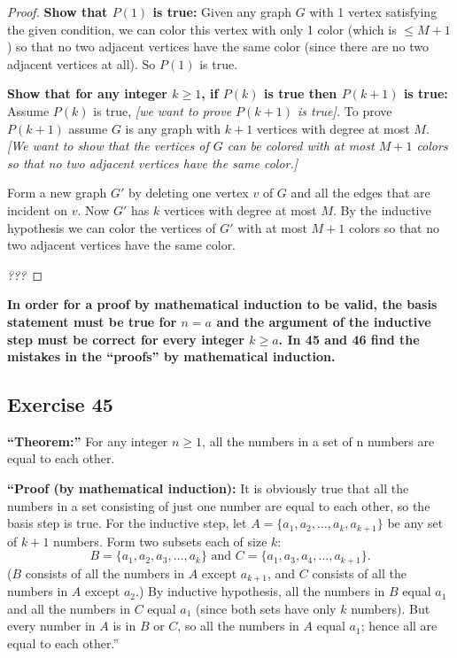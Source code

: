 \documentclass[14pt]{extarticle}
\newcommand{\cy}{\color{cyan}}
\begin{document}
\begin{proof}
    {\bf Show that $P(1)$ is true:} Given any graph $G$ with 1 vertex satisfying the given condition, we can color this vertex with only 1 color (which is $\leq M+1$) so that no two adjacent vertices have the same color (since there are no two adjacent vertices at all). So $P(1)$ is true.

        {\bf Show that for any integer $k \geq 1$, if $P(k)$ is true then $P(k+1)$ is true:} Assume $P(k)$ is true, {\it [we want to prove $P(k+1)$ is true].} To prove $P(k+1)$ assume $G$ is any graph with $k+1$ vertices with degree at most $M$. {\it [We want to show that the vertices of $G$ can be colored with at most $M+1$ colors so that no two adjacent vertices have the same color.]}


    Form a new graph $G'$ by deleting one vertex $v$ of $G$ and all the edges that are incident on $v$. Now $G'$ has $k$ vertices with degree at most $M$. By the inductive hypothesis we can color the vertices of $G'$ with at most $M+1$ colors so that no two adjacent vertices have the same color.

        {\it ???}
\end{proof}

{\bf \cy In order for a proof by mathematical induction to be valid, the basis statement must be true for $n = a$ and the argument of the inductive step must be correct for every integer $k \geq a$. In 45 and 46 find the mistakes in the “proofs” by mathematical induction.}

\subsection{Exercise 45}
{\bf “Theorem:”} For any integer $n \geq 1$, all the numbers in a set of n numbers are equal to each other.

    {\bf “Proof (by mathematical induction):} It is obviously true that all the numbers in a set consisting of just one number are equal to each other, so the basis step is true. For the inductive step, let $A = \{a_1, a_2, \ldots, a_k, a_{k+1}\}$ be any set of $k + 1$ numbers. Form two subsets each of size $k$:
\[
    B = \{a_1, a_2, a_3, \ldots, a_k\} \text{ and } C = \{a_1, a_3, a_4, \ldots, a_{k+1}\}.
\]
($B$ consists of all the numbers in $A$ except $a_{k+1}$, and $C$ consists of all the numbers in $A$ except $a_2$.) By inductive hypothesis, all the numbers in $B$ equal $a_1$ and all the numbers in $C$ equal $a_1$ (since both sets have only $k$ numbers). But every number in $A$ is in $B$ or $C$, so all the numbers in $A$ equal $a_1$; hence all are equal to each other.”
\end{document}

